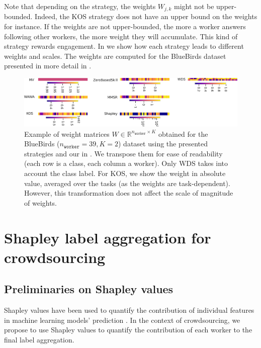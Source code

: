 \documentclass{cap2024}
\begin{document}
Note that depending on the strategy, the weights $W_{j,k}$ might not be upper-bounded.
Indeed, the KOS strategy does not have an upper bound on the weights for instance.
If the weights are not upper-bounded, the more a worker answers following other workers, the more weight they will accumulate.
This kind of strategy rewards engagement.
In  we show how each strategy leads to different weights and scales.
The weights are computed for the BlueBirds dataset \citep{WelinderEtal10b} presented in more detail in .

\begin{figure}[htbp]
  \centering
  \includegraphics[width=\textwidth]{../matrix_weights_bluebirds.pdf}
  \caption{Example of weight matrices $W\in\mathbb{R}^{n_\texttt{worker}\times K}$ obtained for the BlueBirds ($n_\texttt{worker}=39, K=2$) dataset using the presented strategies and our in . We transpose them for ease of readability (each row is a class, each column a worker). Only WDS takes into account the class label. For KOS, we show the weight in absolute value, averaged over the tasks (as the weights are task-dependent). However, this transformation does not affect the scale of magnitude of weights.}
  \label{fig:weights_by_strat}
\end{figure}

\section{Shapley label aggregation for crowdsourcing}
\label{sec:shapagg}

\subsection{Preliminaries on Shapley values}

Shapley values have been used to quantify the contribution of individual features in machine learning models' prediction \citep{molnar2020interpretable}.
In the context of crowdsourcing, we propose to use Shapley values to quantify the contribution of each worker to the final label aggregation.
\end{document}
